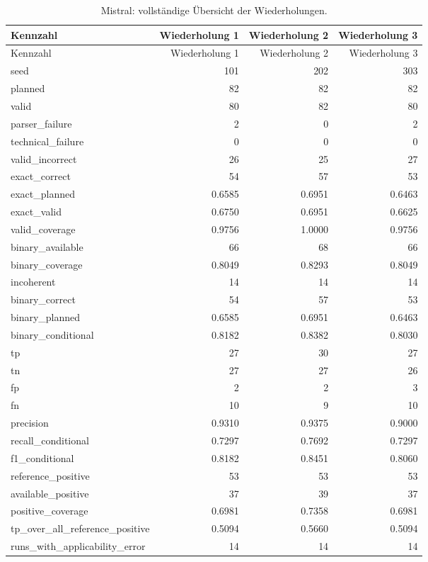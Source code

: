 \begingroup\small
\begin{longtable}{lrrr}
\caption{Mistral: vollständige Übersicht der Wiederholungen.}\label{tab_v2_repetitions_mistral}\\
\toprule
Kennzahl & Wiederholung 1 & Wiederholung 2 & Wiederholung 3 \\
\midrule
\endfirsthead
\toprule
Kennzahl & Wiederholung 1 & Wiederholung 2 & Wiederholung 3 \\
\midrule
\endhead
seed & 101 & 202 & 303 \\
planned & 82 & 82 & 82 \\
valid & 80 & 82 & 80 \\
parser\_failure & 2 & 0 & 2 \\
technical\_failure & 0 & 0 & 0 \\
valid\_incorrect & 26 & 25 & 27 \\
exact\_correct & 54 & 57 & 53 \\
exact\_planned & 0.6585 & 0.6951 & 0.6463 \\
exact\_valid & 0.6750 & 0.6951 & 0.6625 \\
valid\_coverage & 0.9756 & 1.0000 & 0.9756 \\
binary\_available & 66 & 68 & 66 \\
binary\_coverage & 0.8049 & 0.8293 & 0.8049 \\
incoherent & 14 & 14 & 14 \\
binary\_correct & 54 & 57 & 53 \\
binary\_planned & 0.6585 & 0.6951 & 0.6463 \\
binary\_conditional & 0.8182 & 0.8382 & 0.8030 \\
tp & 27 & 30 & 27 \\
tn & 27 & 27 & 26 \\
fp & 2 & 2 & 3 \\
fn & 10 & 9 & 10 \\
precision & 0.9310 & 0.9375 & 0.9000 \\
recall\_conditional & 0.7297 & 0.7692 & 0.7297 \\
f1\_conditional & 0.8182 & 0.8451 & 0.8060 \\
reference\_positive & 53 & 53 & 53 \\
available\_positive & 37 & 39 & 37 \\
positive\_coverage & 0.6981 & 0.7358 & 0.6981 \\
tp\_over\_all\_reference\_positive & 0.5094 & 0.5660 & 0.5094 \\
runs\_with\_applicability\_error & 14 & 14 & 14 \\
\bottomrule
\end{longtable}
\endgroup

